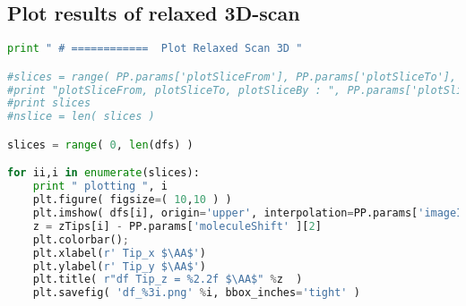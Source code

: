 \subsection{Plot results of relaxed 3D-scan}
\begin{shadedbox}
    \begin{lstlisting}[language=python]
print " # ============  Plot Relaxed Scan 3D "

#slices = range( PP.params['plotSliceFrom'], PP.params['plotSliceTo'], PP.params['plotSliceBy'] )
#print "plotSliceFrom, plotSliceTo, plotSliceBy : ", PP.params['plotSliceFrom'], PP.params['plotSliceTo'], PP.params['plotSliceBy']
#print slices
#nslice = len( slices )

slices = range( 0, len(dfs) )

for ii,i in enumerate(slices):
    print " plotting ", i
    plt.figure( figsize=( 10,10 ) )
    plt.imshow( dfs[i], origin='upper', interpolation=PP.params['imageInterpolation'], cmap=PP.params['colorscale'], extent=extent )
    z = zTips[i] - PP.params['moleculeShift' ][2]
    plt.colorbar();
    plt.xlabel(r' Tip_x $\AA$')
    plt.ylabel(r' Tip_y $\AA$')
    plt.title( r"df Tip_z = %2.2f $\AA$" %z  )
    plt.savefig( 'df_%3i.png' %i, bbox_inches='tight' )

    \end{lstlisting}
\end{shadedbox}
